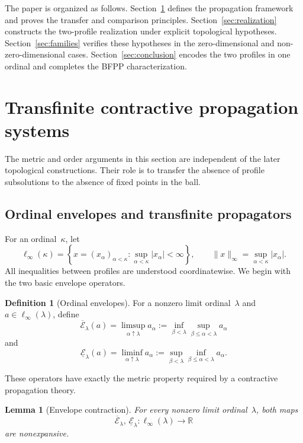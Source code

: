 \documentclass[preprint,12pt,nopreprintline]{elsarticle}
\newtheorem{lemma}[theorem]{Lemma}
\theoremstyle{definition}
\newtheorem{definition}[theorem]{Definition}
\theoremstyle{remark}
\numberwithin{equation}{section}
\begin{document}
\smallskip 

The paper is organized as follows. Section~\ref{sec:tcp} defines the propagation framework and proves
the transfer and comparison principles. Section~\ref{sec:realization} constructs the two-profile realization under explicit topological hypotheses. Section~\ref{sec:families} verifies these hypotheses in the zero-dimensional and non-zero-dimensional cases. Section~\ref{sec:conclusion} encodes the two profiles in one ordinal and completes the BFPP characterization.


\section{Transfinite contractive propagation systems}
\label{sec:tcp}

The metric and order arguments in this section are independent of the later topological constructions. Their role is to transfer the absence of profile subsolutions to the absence of fixed points in the ball.


\subsection{Ordinal envelopes and transfinite propagators}
\label{tcp:subsec:envelopes}

For an ordinal~$\kappa$, let
\[
 \ell_\infty(\kappa)=\left\{x=(x_\alpha)_{\alpha<\kappa}:\sup_{\alpha<\kappa}|x_\alpha|<\infty\right\},\qquad \|x\|_\infty=\sup_{\alpha<\kappa}|x_\alpha|.
\]
All inequalities between profiles are understood coordinatewise. We begin with the two basic envelope operators.

\begin{definition}[Ordinal envelopes]
\label{tcp:def:envelopes}
For a nonzero limit ordinal~$\lambda$ and $a\in\ell_\infty(\lambda)$, define
\[
 \overline{\mathcal E}_\lambda(a)=\limsup_{\alpha\uparrow\lambda}a_\alpha:=\inf_{\beta<\lambda}\sup_{\beta\leq\alpha<\lambda}a_\alpha
\]
and
\[
 \underline{\mathcal E}_\lambda(a)=\liminf_{\alpha\uparrow\lambda}a_\alpha:=\sup_{\beta<\lambda}\inf_{\beta\leq\alpha<\lambda}a_\alpha.
\]
\end{definition}

These operators have exactly the metric property required by a contractive propagation theory.

\begin{lemma}[Envelope contraction]
\label{tcp:lem:envelope}
For every nonzero limit ordinal~$\lambda$, both maps 
\[
\overline{\mathcal E}_\lambda,\,\underline{\mathcal E}_\lambda:\ell_\infty(\lambda)\longrightarrow\mathbb R 
\]
are nonexpansive.
\end{lemma}
\end{document}
